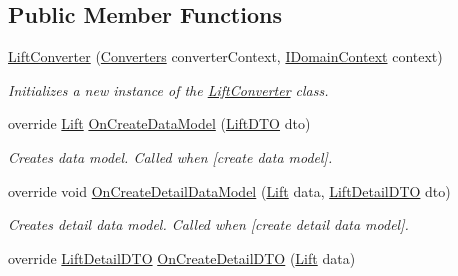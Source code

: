 \subsection*{Public Member Functions}
\begin{DoxyCompactItemize}
\item 
\mbox{\hyperlink{class_bar_none_1_1_shared_1_1_data_converters_1_1_lift_converter_a402f71549f932cff973a1411b3bddbb6}{Lift\+Converter}} (\mbox{\hyperlink{class_bar_none_1_1_shared_1_1_data_converters_1_1_converters}{Converters}} converter\+Context, \mbox{\hyperlink{interface_bar_none_1_1_shared_1_1_core_1_1_i_domain_context}{I\+Domain\+Context}} context)
\begin{DoxyCompactList}\small\item\em Initializes a new instance of the \mbox{\hyperlink{class_bar_none_1_1_shared_1_1_data_converters_1_1_lift_converter}{Lift\+Converter}} class. \end{DoxyCompactList}\item 
override \mbox{\hyperlink{class_bar_none_1_1_shared_1_1_domain_model_1_1_lift}{Lift}} \mbox{\hyperlink{class_bar_none_1_1_shared_1_1_data_converters_1_1_lift_converter_a3ca6208304f49fc472d8d6ad464c6bef}{On\+Create\+Data\+Model}} (\mbox{\hyperlink{class_bar_none_1_1_shared_1_1_data_transfer_1_1_lift_d_t_o}{Lift\+D\+TO}} dto)
\begin{DoxyCompactList}\small\item\em Creates data model. Called when \mbox{[}create data model\mbox{]}. \end{DoxyCompactList}\item 
override void \mbox{\hyperlink{class_bar_none_1_1_shared_1_1_data_converters_1_1_lift_converter_a9594ba5e673d1b9488505fd9b6819672}{On\+Create\+Detail\+Data\+Model}} (\mbox{\hyperlink{class_bar_none_1_1_shared_1_1_domain_model_1_1_lift}{Lift}} data, \mbox{\hyperlink{class_bar_none_1_1_shared_1_1_data_transfer_1_1_lift_detail_d_t_o}{Lift\+Detail\+D\+TO}} dto)
\begin{DoxyCompactList}\small\item\em Creates detail data model. Called when \mbox{[}create detail data model\mbox{]}. \end{DoxyCompactList}\item 
override \mbox{\hyperlink{class_bar_none_1_1_shared_1_1_data_transfer_1_1_lift_detail_d_t_o}{Lift\+Detail\+D\+TO}} \mbox{\hyperlink{class_bar_none_1_1_shared_1_1_data_converters_1_1_lift_converter_adb3621365c88f653034fb51d1cc61719}{On\+Create\+Detail\+D\+TO}} (\mbox{\hyperlink{class_bar_none_1_1_shared_1_1_domain_model_1_1_lift}{Lift}} data)

\end{DoxyCompactItemize}
